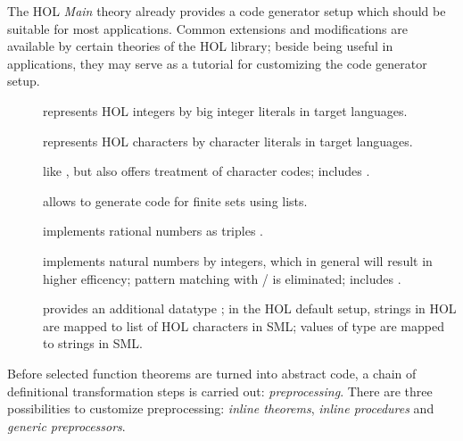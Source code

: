 \begin{isabellebody}
\begin{isamarkuptext}
\begin{itemize}
  \end{itemize}%
\end{isamarkuptext}%
\isamarkuptrue%
%
\isamarkuptrue%
%
\begin{isamarkuptext}%
The HOL \emph{Main} theory already provides a code generator setup
  which should be suitable for most applications. Common extensions
  and modifications are available by certain theories of the HOL
  library; beside being useful in applications, they may serve
  as a tutorial for customizing the code generator setup.

  \begin{description}

    \item[] represents HOL integers by big
       integer literals in target languages.
    \item[] represents HOL characters by 
       character literals in target languages.
    \item[] like ,
       but also offers treatment of character codes; includes
       .
    \item[] allows to generate code
       for finite sets using lists.
    \item[] \label{exec_rat} implements rational
       numbers as triples .
    \item[] \label{eff_nat} implements natural numbers by integers,
       which in general will result in higher efficency; pattern
       matching with  / 
       is eliminated;  includes .
    \item[] provides an additional datatype ;
       in the HOL default setup, strings in HOL are mapped to list
       of HOL characters in SML; values of type  are
       mapped to strings in SML.

  \end{description}%
\end{isamarkuptext}%
\isamarkuptrue%
%
\isamarkuptrue%
%
\begin{isamarkuptext}%
Before selected function theorems are turned into abstract
  code, a chain of definitional transformation steps is carried
  out: \emph{preprocessing}. There are three possibilities
  to customize preprocessing: \emph{inline theorems},
  \emph{inline procedures} and \emph{generic preprocessors}.


\end{isamarkuptext}
\end{isabellebody}
